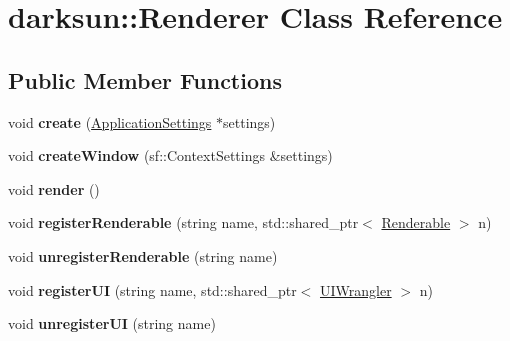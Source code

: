 \hypertarget{classdarksun_1_1_renderer}{}\section{darksun\+::Renderer Class Reference}
\label{classdarksun_1_1_renderer}
\subsection*{Public Member Functions}
\begin{DoxyCompactItemize}
\item 
\mbox{\label{classdarksun_1_1_renderer_af7a21a7a0d396e7cc0ce9477903224f0}} 
void {\bfseries create} (\mbox{\hyperlink{classdarksun_1_1_application_settings}{Application\+Settings}} $\ast$settings)
\item 
\mbox{\label{classdarksun_1_1_renderer_ab2ec7ca942ed7a56651c9c8b16fcf910}} 
void {\bfseries create\+Window} (sf\+::\+Context\+Settings \&settings)
\item 
\mbox{\label{classdarksun_1_1_renderer_af7e5f8f68742f198e315fb4683a605a4}} 
void {\bfseries render} ()
\item 
\mbox{\label{classdarksun_1_1_renderer_a5a3848af701c8a6a922af248e91a8be7}} 
void {\bfseries register\+Renderable} (string name, std\+::shared\+\_\+ptr$<$ \mbox{\hyperlink{classdarksun_1_1_renderable}{Renderable}} $>$ n)
\item 
\mbox{\label{classdarksun_1_1_renderer_a5fcbe46aa3c11e42752b5ea72a21f482}} 
void {\bfseries unregister\+Renderable} (string name)
\item 
\mbox{\label{classdarksun_1_1_renderer_ac9dcf99f0695acdec5d4bcb14e8c81e4}} 
void {\bfseries register\+UI} (string name, std\+::shared\+\_\+ptr$<$ \mbox{\hyperlink{classdarksun_1_1_u_i_wrangler}{U\+I\+Wrangler}} $>$ n)
\item 
\mbox{\label{classdarksun_1_1_renderer_a22bce680be79cb034e276c00e5a5187c}} 
void {\bfseries unregister\+UI} (string name)
\item 

\end{DoxyCompactItemize}

